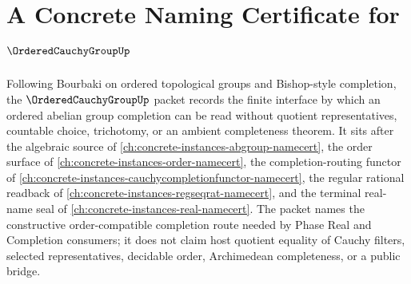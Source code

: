 \chapter{A Concrete Naming Certificate for $\OrderedCauchyGroupUp$}
\label{ch:concrete-instances-ordered-cauchy-group-namecert}

Following Bourbaki on ordered topological groups and Bishop-style completion, the $\OrderedCauchyGroupUp$ packet records the finite interface by which an ordered abelian group completion can be read without quotient representatives, countable choice, trichotomy, or an ambient completeness theorem. It sits after the algebraic source of \autoref{ch:concrete-instances-abgroup-namecert}, the order surface of \autoref{ch:concrete-instances-order-namecert}, the completion-routing functor of \autoref{ch:concrete-instances-cauchycompletionfunctor-namecert}, the regular rational readback of \autoref{ch:concrete-instances-regseqrat-namecert}, and the terminal real-name seal of \autoref{ch:concrete-instances-real-namecert}. The packet names the constructive order-compatible completion route needed by Phase Real and Completion consumers; it does not claim host quotient equality of Cauchy filters, selected representatives, decidable order, Archimedean completeness, or a public bridge.

